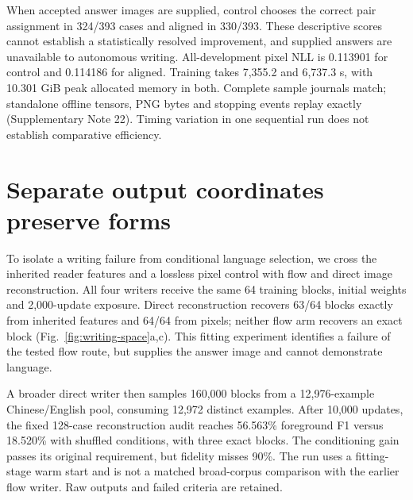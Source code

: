\documentclass[12pt,a4paper]{article}
\begin{document}
When accepted answer images are supplied, control chooses the correct pair
assignment in 324/393 cases and aligned in 330/393. These descriptive scores
cannot establish a statistically resolved improvement, and supplied answers
are unavailable to autonomous writing. All-development pixel NLL is 0.113901
for control and 0.114186 for aligned. Training takes 7,355.2 and 6,737.3 s,
with 10.301 GiB peak allocated memory in both. Complete sample journals match;
standalone offline tensors, PNG bytes and stopping events replay exactly
(Supplementary Note 22). Timing variation in one sequential run does not
establish comparative efficiency.


\section*{Separate output coordinates preserve forms}
To isolate a writing failure from conditional language selection, we cross
the inherited reader features and a lossless pixel control with flow and
direct image reconstruction. All four writers receive the same 64 training
blocks, initial weights and 2,000-update exposure. Direct reconstruction
recovers 63/64 blocks exactly from inherited features and 64/64 from pixels;
neither flow arm recovers an exact block (Fig.~\ref{fig:writing-space}a,c).
This fitting experiment identifies a failure of the tested flow route, but
supplies the answer image and cannot demonstrate language.

A broader direct writer then samples 160,000 blocks from a 12,976-example
Chinese/English pool, consuming 12,972 distinct examples. After 10,000 updates,
the fixed 128-case reconstruction audit reaches 56.563\% foreground F1 versus
18.520\% with shuffled conditions, with three exact blocks. The conditioning
gain passes its original requirement, but fidelity misses 90\%. The run
uses a fitting-stage warm start and is not a matched broad-corpus comparison
with the earlier flow writer. Raw outputs and failed criteria are retained.
\end{document}

